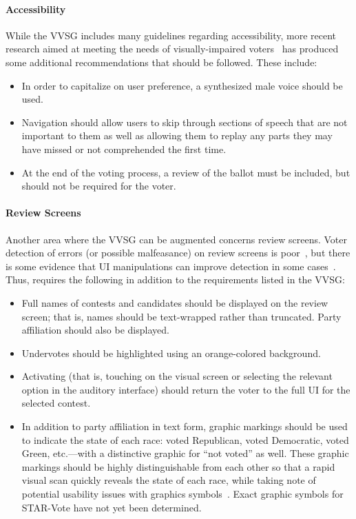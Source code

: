 \paragraph{Accessibility}
While the VVSG includes many guidelines regarding accessibility, more recent research aimed at meeting the needs of visually-impaired voters~\cite{piner-11} has produced some additional recommendations that should be followed. These include:
\begin{itemize}
\item  In order  to capitalize on user preference, a synthesized male voice should be used.
\item Navigation should allow users to skip through sections of speech that are not important to them as well as allowing them to replay any parts they may have missed or not comprehended the first time.
\item At the end of the voting process, a review of the ballot must be included, but should not be required for the voter. 
\end{itemize}

\paragraph{Review Screens}
Another area where the VVSG can be augmented concerns review screens. 
Voter detection of errors (or possible malfeasance) on review screens is poor~\cite{everett-thesis}, but there is some evidence that UI manipulations can improve detection in some cases~\cite{campbell-evt09}. Thus, \projname  requires the following in addition to the requirements listed in the VVSG:
\begin{itemize}
\item  Full names of contests and candidates should be displayed on the review screen; that is, names should be text-wrapped rather than truncated. 
Party affiliation should also be displayed.
\item Undervotes should be highlighted using an orange-colored background. 
\item Activating (that is, touching on the visual screen or selecting the relevant option in the auditory interface) should return the voter to the full UI for the selected contest.
\item In addition to party affiliation in text form, graphic markings should be used to indicate the state of each race: voted Republican, voted Democratic, voted Green, etc.---with a distinctive graphic for ``not voted'' as well. These graphic markings should be highly distinguishable from each other so that a rapid visual scan quickly reveals the state of each race, while taking note of potential usability issues with graphics symbols~\cite{laskowski-symbols}.  Exact graphic symbols for STAR-Vote have not yet been determined.
\end{itemize}

